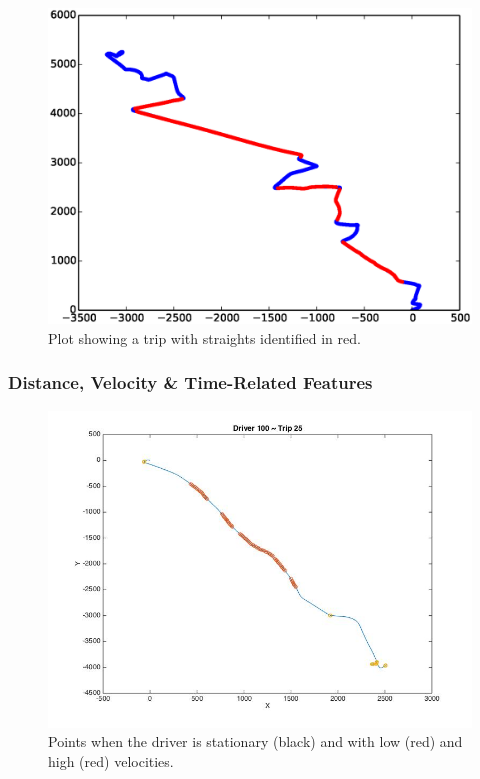 \documentclass[a4paper, 11pt, twocolumn]{report}
\begin{document}
\begin{figure}[h]
    \center
    \includegraphics[width=\linewidth]{img/straights.eps}
    \caption{Plot showing a trip with straights identified in red.}
    \label{fig:straights}
\end{figure}

\subsubsection{Distance, Velocity \& Time-Related Features}

\begin{figure}[h]
    \center
    \includegraphics[width=\linewidth]{img/speed_highlights}
    \caption{Points when the driver is stationary (black) and with low (red) and high (red) velocities.}
    \label{fig:speedpoints}
\end{figure}
\end{document}
